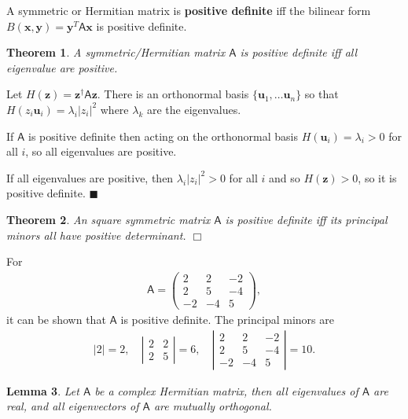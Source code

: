 \documentclass[letter-paper]{tufte-book}
\newtheorem{theorem}{\color{pastel-blue}Theorem}[section]
\newtheorem{lemma}[theorem]{\color{pastel-blue}Lemma}
\newenvironment{proof}[1][Proof]{\begin{trivlist}
\item[\hskip \labelsep {\bfseries #1}]}{\end{trivlist}}
\newenvironment{example}[1][Example]{\begin{trivlist}
\item[\hskip \labelsep {\bfseries #1}]}{\end{trivlist}}
\newcommand{\As}{{\mathsf{A}}}
\newcommand{\ub}{{\boldsymbol{u}}}
\newcommand{\xb}{{\boldsymbol{x}}}
\newcommand{\yb}{{\boldsymbol{y}}}
\newcommand{\zb}{{\boldsymbol{z}}}
\newcommand{\qed}{\hfill$\blacksquare$}
\newcommand{\qedwhite}{\hfill \ensuremath{\Box}}
\begin{document}
A symmetric or Hermitian matrix is \textbf{positive definite} iff the bilinear form $B(\xb,\yb) = \yb^T \As \xb$ is positive definite.

\begin{theorem}
  A symmetric/Hermitian matrix $\As$ is positive definite iff all eigenvalue are positive.
\end{theorem}

\begin{proof}
  Let $H(\zb) = \zb^\dagger \As \zb$. There is an orthonormal basis $\{\ub_1, \ldots \ub_n\}$ so that $H(z_i \ub_i) = \lambda_i |z_i|^2$ where $\lambda_k$ are the eigenvalues.
  
  If $\As$ is positive definite then acting on the orthonormal basis $H(\ub_i) = \lambda_i > 0$ for all $i$, so all eigenvalues are positive.
  
  If all eigenvalues are positive, then $\lambda_i |z_i|^2 > 0$ for all $i$ and so $H(\zb) > 0$, so it is positive definite. \qed
\end{proof}

\begin{theorem}
  An square symmetric matrix $\As$ is positive definite iff its principal minors all have positive determinant. \qedwhite
\end{theorem}

\begin{example}
  For
  \begin{align*}
    \As = \begin{pmatrix}2 & 2 & -2 \\ 2 & 5 & -4 \\ -2 & -4 & 5 \end{pmatrix},
  \end{align*}
  it can be shown that $\As$ is positive definite. The principal minors are
  \begin{align*}
    |2| = 2, \quad 
    \left|\begin{matrix} 2 & 2 \\ 2 & 5 \end{matrix}\right| = 6, \quad
    \left|\begin{matrix} 2 & 2 & -2 \\ 2 & 5 & -4 \\ -2 & -4 & 5\end{matrix}\right| = 10.
  \end{align*}
\end{example}

\begin{lemma}
  Let $\As$ be a complex Hermitian matrix, then all eigenvalues of $\As$ are real, and all eigenvectors of $\As$ are mutually orthogonal. 
\end{lemma}
\end{document}
